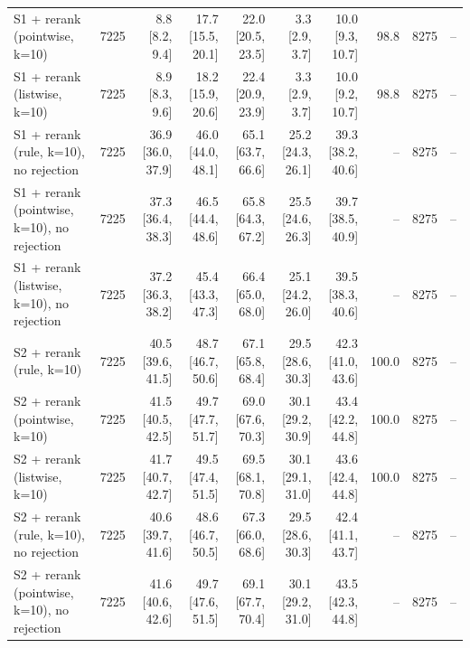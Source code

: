 \begin{tabular}{lrrrrrrrrr}
S1 + rerank (pointwise, k=10) & 7225 & 8.8 \scriptsize{[8.2, 9.4]} & 17.7 \scriptsize{[15.5, 20.1]} & 22.0 \scriptsize{[20.5, 23.5]} & 3.3 \scriptsize{[2.9, 3.7]} & 10.0 \scriptsize{[9.3, 10.7]} & 98.8 & 8275 & -- \\
S1 + rerank (listwise, k=10) & 7225 & 8.9 \scriptsize{[8.3, 9.6]} & 18.2 \scriptsize{[15.9, 20.6]} & 22.4 \scriptsize{[20.9, 23.9]} & 3.3 \scriptsize{[2.9, 3.7]} & 10.0 \scriptsize{[9.2, 10.7]} & 98.8 & 8275 & -- \\
\midrule
S1 + rerank (rule, k=10), no rejection & 7225 & 36.9 \scriptsize{[36.0, 37.9]} & 46.0 \scriptsize{[44.0, 48.1]} & 65.1 \scriptsize{[63.7, 66.6]} & 25.2 \scriptsize{[24.3, 26.1]} & 39.3 \scriptsize{[38.2, 40.6]} & -- & 8275 & -- \\
S1 + rerank (pointwise, k=10), no rejection & 7225 & 37.3 \scriptsize{[36.4, 38.3]} & 46.5 \scriptsize{[44.4, 48.6]} & 65.8 \scriptsize{[64.3, 67.2]} & 25.5 \scriptsize{[24.6, 26.3]} & 39.7 \scriptsize{[38.5, 40.9]} & -- & 8275 & -- \\
S1 + rerank (listwise, k=10), no rejection & 7225 & 37.2 \scriptsize{[36.3, 38.2]} & 45.4 \scriptsize{[43.3, 47.3]} & 66.4 \scriptsize{[65.0, 68.0]} & 25.1 \scriptsize{[24.2, 26.0]} & 39.5 \scriptsize{[38.3, 40.6]} & -- & 8275 & -- \\
\midrule
S2 + rerank (rule, k=10) & 7225 & 40.5 \scriptsize{[39.6, 41.5]} & 48.7 \scriptsize{[46.7, 50.6]} & 67.1 \scriptsize{[65.8, 68.4]} & 29.5 \scriptsize{[28.6, 30.3]} & 42.3 \scriptsize{[41.0, 43.6]} & 100.0 & 8275 & -- \\
S2 + rerank (pointwise, k=10) & 7225 & 41.5 \scriptsize{[40.5, 42.5]} & 49.7 \scriptsize{[47.7, 51.7]} & 69.0 \scriptsize{[67.6, 70.3]} & 30.1 \scriptsize{[29.2, 30.9]} & 43.4 \scriptsize{[42.2, 44.8]} & 100.0 & 8275 & -- \\
S2 + rerank (listwise, k=10) & 7225 & 41.7 \scriptsize{[40.7, 42.7]} & 49.5 \scriptsize{[47.4, 51.5]} & 69.5 \scriptsize{[68.1, 70.8]} & 30.1 \scriptsize{[29.1, 31.0]} & 43.6 \scriptsize{[42.4, 44.8]} & 100.0 & 8275 & -- \\
\midrule
S2 + rerank (rule, k=10), no rejection & 7225 & 40.6 \scriptsize{[39.7, 41.6]} & 48.6 \scriptsize{[46.7, 50.5]} & 67.3 \scriptsize{[66.0, 68.6]} & 29.5 \scriptsize{[28.6, 30.3]} & 42.4 \scriptsize{[41.1, 43.7]} & -- & 8275 & -- \\
S2 + rerank (pointwise, k=10), no rejection & 7225 & 41.6 \scriptsize{[40.6, 42.6]} & 49.7 \scriptsize{[47.6, 51.5]} & 69.1 \scriptsize{[67.7, 70.4]} & 30.1 \scriptsize{[29.2, 31.0]} & 43.5 \scriptsize{[42.3, 44.8]} & -- & 8275 & -- \\

\end{tabular}
